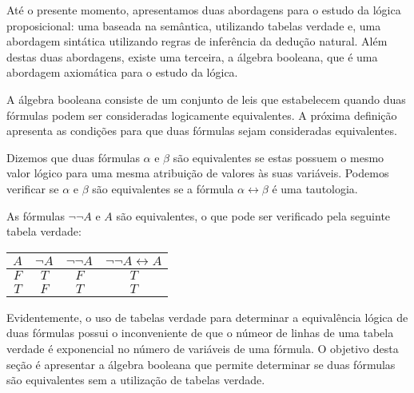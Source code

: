 Até o presente momento, apresentamos duas abordagens para o estudo da
lógica proposicional: uma baseada na semântica, utilizando tabelas
verdade e, uma abordagem sintática utilizando regras de inferência da
dedução natural. Além destas duas abordagens, existe uma terceira,
a álgebra booleana, que é uma abordagem axiomática para o estudo da
lógica.

A álgebra booleana consiste de um conjunto de leis que estabelecem
quando duas fórmulas podem ser consideradas
logicamente equivalentes. A próxima definição apresenta as condições
para que duas fórmulas sejam consideradas equivalentes.

\begin{Definition}
Dizemos que duas
fórmulas $\alpha$ e $\beta$ são equivalentes se estas possuem o mesmo valor lógico para
uma mesma atribuição de valores às suas variáveis. Podemos verificar
se $\alpha$ e $\beta$ são equivalentes se a
fórmula $\alpha\leftrightarrow\beta$ é uma tautologia.
\end{Definition}

\begin{Example}
As fórmulas $\neg \neg A$ e $A$ são equivalentes,
o que pode ser verificado pela seguinte tabela verdade:
\begin{table}[h]
  \begin{tabular}{|c|c|c|c|} \hline
      $A$ & $\neg A$ & $\neg \neg A$ & $\neg\neg A\leftrightarrow A$
      \\ \hline
      $F$ & $T$ & $F$ & $T$\\
      $T$ & $F$ & $T$ & $T$ \\ \hline
   \end{tabular}
   \centering
\end{table}
\end{Example}
Evidentemente, o uso de tabelas verdade para determinar a equivalência
lógica de duas fórmulas possui o inconveniente de que o númeor de
linhas de uma tabela verdade é exponencial no número de variáveis de
uma fórmula. O objetivo desta seção é apresentar a álgebra booleana
que permite determinar se duas fórmulas são equivalentes sem a
utilização de tabelas verdade.

